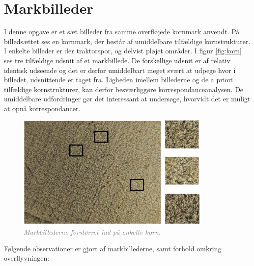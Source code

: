 \section{Markbilleder}
I denne opgave er et sæt billeder fra samme overfløjede kornmark anvendt. På billedsættet ses en kornmark, der består af umiddelbare tilfældige kornstrukturer. I enkelte billeder er der traktorspor, og delvist pløjet områder. I figur \eqref{fig:korn} ses tre tilfældige udsnit af et markbillede. De forskellige udsnit er af relativ identisk udseende og det er derfor umiddelbart meget svært at udpege hvor i billedet, udsnittende er taget fra. Ligheden imellem billederne og de a priori tilfældige kornstrukturer, kan derfor besværliggøre korrespondanceanalysen. De umiddelbare udfordringer gør det interessant at undersøge, hvorvidt det er muligt at opnå korrespondancer.
\begin{figure}[H]
    \centering
    \includegraphics[width=0.85\textwidth]{fig/20a.png}
    \begin{center}    
       \caption{\textcolor{gray}{\footnotesize \textit{Markbillederne forstørret ind på enkelte korn.}}}
    \label{fig:korn}
     \end{center}
     \vspace{-2.5em}
  \end{figure} \noindent
Følgende observationer er gjort af markbillederne, samt forhold omkring overflyvningen:
